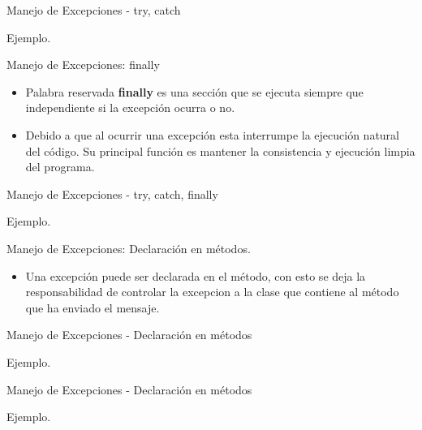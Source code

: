 \begin{frame}{Manejo de Excepciones - try, catch}
	\begin{block}{Ejemplo.}

\end{block}
\end{frame}

\begin{frame}{Manejo de Excepciones: finally}
\begin{itemize}
	\item Palabra reservada \textbf{finally} es una secci\'on que se ejecuta siempre que independiente si la excepci\'on ocurra o no.
	\item Debido a que al ocurrir una excepci\'on esta  interrumpe la ejecuci\'on natural del c\'odigo.  Su principal funci\'on es mantener la consistencia y ejecuci\'on limpia del programa.
\end{itemize}
\end{frame}

\begin{frame}{Manejo de Excepciones - try, catch, finally}
	\begin{block}{Ejemplo.}

\end{block}
\end{frame}

\begin{frame}{Manejo de Excepciones: Declaraci\'on en m\'etodos.}
\begin{itemize}
	\item Una excepci\'on puede ser declarada en el m\'etodo, con esto se deja la responsabilidad de
	controlar la excepcion a la clase que contiene al m\'etodo que ha enviado el mensaje.
\end{itemize}
\end{frame}

\begin{frame}{Manejo de Excepciones - Declaraci\'on en m\'etodos}
	\begin{block}{Ejemplo.}

\end{block}
\end{frame}

\begin{frame}{Manejo de Excepciones - Declaraci\'on en m\'etodos}
	\begin{block}{Ejemplo.}

\end{block}
\end{frame}
